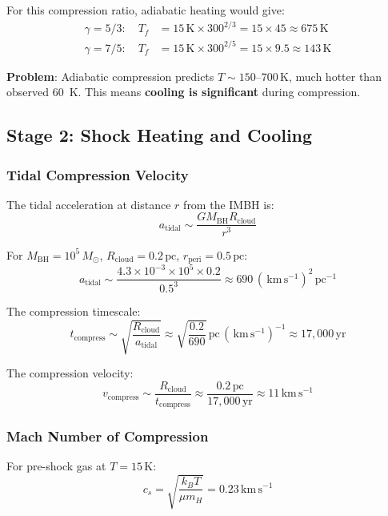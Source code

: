 \documentclass[11pt,a4paper]{article}
\newcommand{\Msun}{M_\odot}
\newcommand{\kms}{\,\mathrm{km\,s^{-1}}}
\newcommand{\pc}{\,\mathrm{pc}}
\begin{document}
For this compression ratio, adiabatic heating would give:
\begin{align}
    \gamma = 5/3: \quad T_f &= 15\,\mathrm{K} \times 300^{2/3} = 15 \times 45 \approx 675\,\mathrm{K} \\
    \gamma = 7/5: \quad T_f &= 15\,\mathrm{K} \times 300^{2/5} = 15 \times 9.5 \approx 143\,\mathrm{K}
\end{align}

\textbf{Problem}: Adiabatic compression predicts $T \sim 150$--$700\,\mathrm{K}$,
much hotter than observed 60~K. This means \textbf{cooling is significant} during compression.

\subsection{Stage 2: Shock Heating and Cooling}

\subsubsection{Tidal Compression Velocity}
The tidal acceleration at distance $r$ from the IMBH is:
\begin{equation}
    a_\mathrm{tidal} \sim \frac{G M_\mathrm{BH} R_\mathrm{cloud}}{r^3}
\end{equation}

For $M_\mathrm{BH} = 10^5\,\Msun$, $R_\mathrm{cloud} = 0.2\pc$, $r_\mathrm{peri} = 0.5\pc$:
\begin{equation}
    a_\mathrm{tidal} \sim \frac{4.3 \times 10^{-3} \times 10^5 \times 0.2}{0.5^3}
    \approx 690\,(\kms)^2\,\mathrm{pc}^{-1}
\end{equation}

The compression timescale:
\begin{equation}
    t_\mathrm{compress} \sim \sqrt{\frac{R_\mathrm{cloud}}{a_\mathrm{tidal}}}
    \approx \sqrt{\frac{0.2}{690}}\,\mathrm{pc}\,(\kms)^{-1} \approx 17{,}000\,\mathrm{yr}
\end{equation}

The compression velocity:
\begin{equation}
    v_\mathrm{compress} \sim \frac{R_\mathrm{cloud}}{t_\mathrm{compress}}
    \approx \frac{0.2\pc}{17{,}000\,\mathrm{yr}} \approx 11\kms
\end{equation}

\subsubsection{Mach Number of Compression}
For pre-shock gas at $T = 15\,\mathrm{K}$:
\begin{equation}
    c_s = \sqrt{\frac{k_B T}{\mu m_H}} = 0.23\kms
\end{equation}
\end{document}
